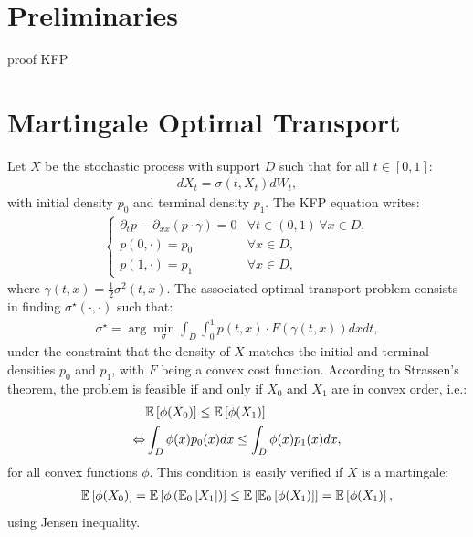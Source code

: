 \section{Preliminaries}

proof KFP

\section{Martingale Optimal Transport}

Let $X$ be the stochastic process with support $D$ such that for all $t \in [0, 1]$:
\begin{align}
    dX_t = \sigma(t, X_t) dW_t,
\end{align}
with initial density $p_0$ and terminal density $p_1$. The KFP equation writes:
\begin{align}
    \left\{
    \begin{array}{ll}
        \partial_t p - \partial_{xx}(p \cdot \gamma) = 0 & \forall t \in (0, 1) \, \forall x \in D, \\
        p(0, \cdot) = p_0 & \forall x \in D, \\
        p(1, \cdot) = p_1 & \forall x \in D,
    \end{array}
    \right.
\end{align}
where $\gamma(t, x) = \frac{1}{2} \sigma^2(t, x)$. The associated optimal transport problem consists in finding $\sigma^\star(\cdot, \cdot)$ such that:
\begin{align}
    \sigma^\star = \arg\min_{\sigma} \int_D \int_0^1 p(t, x) \cdot F(\gamma(t, x)) dx dt,
\end{align}
under the constraint that the density of $X$ matches the initial and terminal densities $p_0$ and $p_1$, with $F$ being a convex cost function. According to Strassen's theorem, the problem is feasible if and only if $X_0$ and $X_1$ are in convex order, i.e.:
\begin{align}
    & \mathbb{E}\left[ \phi(X_0) \right] \le \mathbb{E}\left[ \phi(X_1) \right] \\
    \Leftrightarrow & \int_D \phi(x) p_0(x) dx \le \int_D \phi(x) p_1(x) dx,
\end{align}
for all convex functions $\phi$. This condition is easily verified if $X$ is a martingale:
\begin{align}
    \mathbb{E}\left[ \phi(X_0) \right] = \mathbb{E}\left[ \phi\left(\mathbb{E}_{0}\left[ X_1 \right]\right) \right] \le \mathbb{E}\left[ \mathbb{E}_{0}\left[ \phi(X_1) \right] \right] = \mathbb{E}\left[ \phi(X_1) \right],
\end{align}
using Jensen inequality.